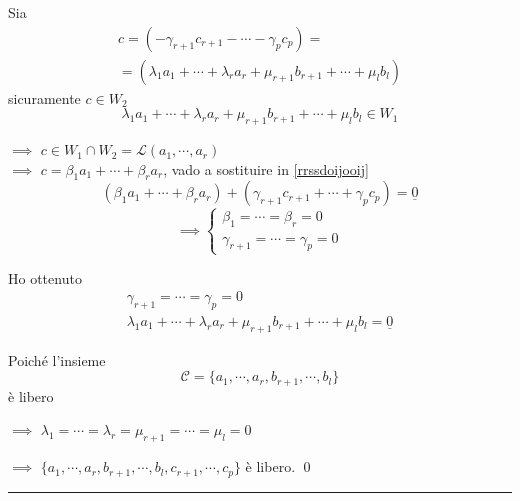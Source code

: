 {\begin{enumerate}
    Sia \begin{multline*}c=(-\gamma_{r+1} c_{r+1} - \cdots - \gamma_p c_p)=\\=(\lambda_1a_1+ \cdots + \lambda_r a_r + \mu_{r+1} b_{r+1} + \cdots + \mu_l b_l)\end{multline*} sicuramente $c \in W_2$
    \[\lambda_1 a_1+ \cdots + \lambda_r a_r + \mu_{r+1} b_{r+1} + \cdots + \mu_l b_l \in W_1\] 
    
    $\implies$ $c \in W_1 \cap W_2 = \mathscr{L}(a_1,\cdots, a_r)$ \\
    
    $\implies$ $c = \beta_1 a_1 +\cdots+\beta_r a_r$, vado a sostituire in \eqref{rrssdoijooij}
    \[(\beta_1 a_1 +\cdots+\beta_r a_r)+(\gamma_{r+1} c_{r+1} + \cdots + \gamma_p c_p) = \underline{0}\]
    \[\implies \begin{cases}
    	\beta_1=\cdots=\beta_r=0\\
    	\gamma_{r+1}=\cdots=\gamma_p=0
    \end{cases}\]	%

    Ho ottenuto
    \begin{gather*}
    \gamma_{r+1}=\cdots=\gamma_p=0\\
    \lambda_1a_1+ \cdots + \lambda_r a_r + \mu_{r+1} b_{r+1} + \cdots + \mu_l b_l=\underline{0}
    \end{gather*}
     
    Poiché l'insieme \[\mathscr{C}=\{a_1, \cdots, a_r, b_{r+1}, \cdots, b_l\}\] è libero
    
    $\implies$ $\lambda_1=\cdots=\lambda_r = \mu_{r+1}=\cdots=\mu_l=0$
    
    $\implies$ $\{a_1, \cdots, a_r, b_{r+1}, \cdots, b_l, c_{r+1}, \cdots, c_p\}$ è libero. \qed
\end{enumerate}}

\rule{7em}{.4pt}
 
